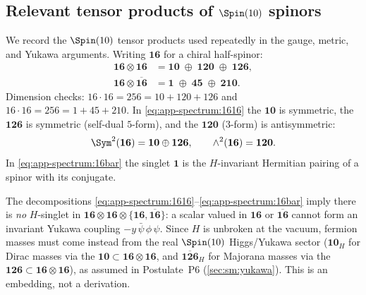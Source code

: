 \subsection{Relevant tensor products of $\Spin(10)$ spinors}
\label{sec:app-spectrum:tensor}

We record the $\Spin(10)$ tensor products used repeatedly in the gauge,
metric, and Yukawa arguments. Writing $\mathbf{16}$ for a chiral
half-spinor:
\begin{align}
  \mathbf{16}\otimes\mathbf{16}
    &= \mathbf{10}\;\oplus\;\mathbf{120}\;\oplus\;\mathbf{126},
    \label{eq:app-spectrum:1616}\\
  \mathbf{16}\otimes\overline{\mathbf{16}}
    &= \mathbf{1}\;\oplus\;\mathbf{45}\;\oplus\;\mathbf{210}.
    \label{eq:app-spectrum:16bar}
\end{align}
Dimension checks: $16\cdot16=256=10+120+126$ and
$16\cdot16=256=1+45+210$. In \eqref{eq:app-spectrum:1616} the
$\mathbf{10}$ is symmetric, the $\mathbf{126}$ is symmetric (self-dual
$5$-form), and the $\mathbf{120}$ ($3$-form) is antisymmetric:
\begin{equation}
  \Sym^2(\mathbf{16}) = \mathbf{10}\oplus\mathbf{126},
  \qquad
  \wedge^2(\mathbf{16}) = \mathbf{120}.
  \label{eq:app-spectrum:symanti}
\end{equation}
In \eqref{eq:app-spectrum:16bar} the singlet $\mathbf 1$ is the
$H$-invariant Hermitian pairing of a spinor with its conjugate.

\begin{remark}\label{rem:app-spectrum:yukawa}
The decompositions \eqref{eq:app-spectrum:1616}--\eqref{eq:app-spectrum:16bar}
imply there is \emph{no} $H$-singlet in
$\mathbf{16}\otimes\mathbf{16}\otimes\{\mathbf{16},\overline{\mathbf{16}}\}$:
a scalar valued in $\mathbf{16}$ or $\overline{\mathbf{16}}$ cannot form
an invariant Yukawa coupling $-y\,\bar\psi\,\phi\,\psi$. Since $H$ is
unbroken at the vacuum, fermion masses must come instead from the real
$\Spin(10)$ Higgs/Yukawa sector ($\mathbf{10}_H$ for Dirac masses via the
$\mathbf{10}\subset\mathbf{16}\otimes\mathbf{16}$, and
$\overline{\mathbf{126}}_H$ for Majorana masses via the
$\mathbf{126}\subset\mathbf{16}\otimes\mathbf{16}$), as assumed in
Postulate~P6 (\autoref{sec:sm:yukawa}). This is an embedding, not a
derivation.
\end{remark}

